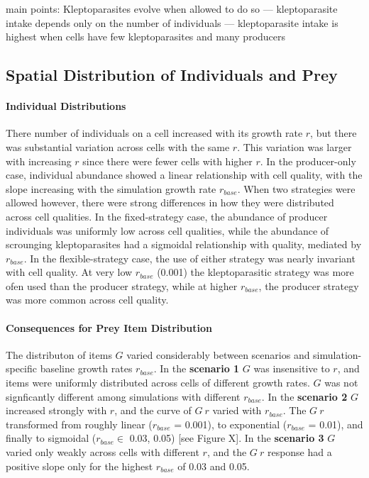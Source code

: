 \documentclass[11pt]{article}
\begin{document}
main points: Kleptoparasites evolve when allowed to do so --- kleptoparasite intake depends only on the number of individuals --- kleptoparasite intake is highest when cells have few kleptoparasites and many producers

\subsection*{Spatial Distribution of Individuals and Prey}

\paragraph{Individual Distributions}

There number of individuals on a cell increased with its growth rate $r$, but there was substantial variation across cells with the same $r$. 
This variation was larger with increasing $r$ since there were fewer cells with higher $r$.
In the producer-only case, individual abundance showed a linear relationship with cell quality, with the slope increasing with the simulation growth rate $r_{base}$.
When two strategies were allowed however, there were strong differences in how they were distributed across cell qualities.
In the fixed-strategy case, the abundance of producer individuals was uniformly low across cell qualities, while the abundance of scrounging kleptoparasites had a sigmoidal relationship with quality, mediated by $r_{base}$.
In the flexible-strategy case, the use of either strategy was nearly invariant with cell quality.
At very low $r_{base}$ (0.001) the kleptoparasitic strategy was more ofen used than the producer strategy, while at higher $r_{base}$, the producer strategy was more common across cell quality.

\paragraph{Consequences for Prey Item Distribution}

The distributon of items $G$ varied considerably between scenarios and simulation-specific baseline growth rates $r_{base}$.
In the \textbf{scenario 1} $G$ was insensitive to $r$, and items were uniformly distributed across cells of different growth rates.
$G$ was not signficantly different among simulations with different $r_{base}$.
In the \textbf{scenario 2} $G$ increased strongly with $r$, and the curve of $G ~ r$ varied with $r_{base}$.
The $G ~ r$ transformed from roughly linear ($r_{base}$ = 0.001), to exponential ($r_{base}$ = 0.01), and finally to sigmoidal ($r_{base} \in$ 0.03, 0.05) [see Figure X].
In the \textbf{scenario 3} $G$ varied only weakly across cells with different $r$, and the $G ~ r$ response had a positive slope only for the highest $r_{base}$ of 0.03 and 0.05.
\end{document}
